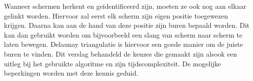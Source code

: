 Wanneer schermen herkent en geïdentificeerd zijn, moeten ze ook nog aan elkaar gelinkt worden. Hiervoor zal eerst elk scherm zijn eigen positie toegewezen krijgen. Daarna kan aan de hand van deze positie zijn buren bepaald worden. Dit kan dan gebruikt worden om bijvoorbeeld een slang van scherm naar scherm te laten bewegen. Delaunay triangulatie is hiervoor een goede manier om de juiste buren te vinden. Dit verslag behandeld de keuzes die gemaakt zijn alsook een uitleg bij het gebruikte algoritme en zijn tijdscomplexiteit. De mogelijke beperkingen worden met deze kennis geduid.